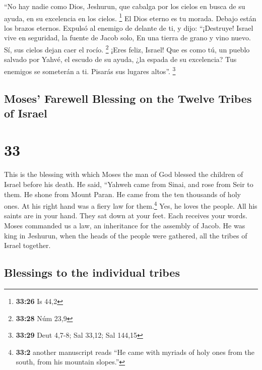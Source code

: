 \begin{paracol}{2}
 ``No hay nadie como Dios, Jeshurun, que cabalga por los
cielos en busca de su ayuda, en su excelencia en los cielos. \footnote{\textbf{33:26}
  Is 44,2}  El Dios eterno es tu morada. Debajo están los
brazos eternos. Expulsó al enemigo de delante de ti, y dijo:
``¡Destruye!  Israel vive en seguridad, la fuente de
Jacob solo, En una tierra de grano y vino nuevo. Sí, sus cielos dejan
caer el rocío. \footnote{\textbf{33:28} Núm 23,9}  ¡Eres
feliz, Israel! Que es como tú, un pueblo salvado por Yahvé, el escudo de
su ayuda, ¿la espada de su excelencia? Tus enemigos se someterán a ti.
Pisarás sus lugares altos''. \footnote{\textbf{33:29} Deut 4,7-8; Sal
  33,12; Sal 144,15}

\switchcolumn
\begin{otherlanguage}{english}

\hypertarget{moses-farewell-blessing-on-the-twelve-tribes-of-israel}{%
\subsection{Moses' Farewell Blessing on the Twelve Tribes of
Israel}\label{moses-farewell-blessing-on-the-twelve-tribes-of-israel}}

\hypertarget{section-65}{%
\section{33}\label{section-65}}

 This is the blessing with which Moses the man of God
blessed the children of Israel before his death.  He said,
``Yahweh came from Sinai, and rose from Seir to them. He shone from
Mount Paran. He came from the ten thousands of holy ones. At his right
hand was a fiery law for them.\footnote{\textbf{33:2} another manuscript
  reads ``He came with myriads of holy ones from the south, from his
  mountain slopes.''}  Yes, he loves the people. All his
saints are in your hand. They sat down at your feet. Each receives your
words.  Moses commanded us a law, an inheritance for the
assembly of Jacob.  He was king in Jeshurun, when the
heads of the people were gathered, all the tribes of Israel together.

\hypertarget{blessings-to-the-individual-tribes}{%
\subsection{Blessings to the individual
tribes}\label{blessings-to-the-individual-tribes}}


\end{otherlanguage}
\end{paracol}
